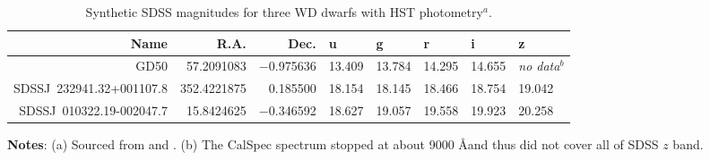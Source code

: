 \documentclass[fleqn,usenatbib]{mnras}
\begin{document}
\begin{table}
	\centering
	\caption{Synthetic SDSS magnitudes for three WD dwarfs with HST photometry$^a$.}
	\label{tab:HST}
	\begin{tabular}{r|r|r|l|l|l|l|l} %
		\hline
		Name & R.A. & Dec. & u & g & r & i & z \\
		\hline
     GD50                     &  57.2091083 &  $-$0.975636 &      13.409 &       13.784 &    14.295 &     14.655 &     {\it no data}$^b$ \\
     SDSSJ~232941.32+001107.8 & 352.4221875 &     0.185500 &      18.154 &       18.145 &    18.466 &     18.754 &     19.042 \\  
     SDSSJ~010322.19-002047.7 &  15.8424625 &  $-$0.346592 &      18.627 &       19.057 &    19.558 &     19.923 &     20.258 \\
		\hline
	\end{tabular}
     \vspace{1ex}

     {\raggedright {\bf Notes}: (a) Sourced from \citet{2014PASP..126..711B} and \citet{2019ApJS..241...20N}. \newline (b) The CalSpec spectrum stopped at about 9000 \AA and thus did not cover all of SDSS $z$ band.\par}
\end{table}


\end{document}
